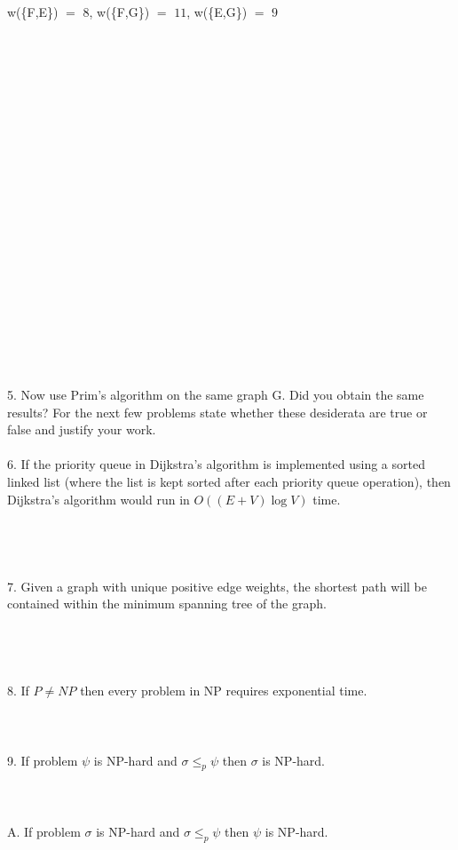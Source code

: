 \documentclass[12pt]{article}
\begin{document}
w(\{F,E\}) $=$ $8$, w(\{F,G\}) $=$ $11$, w(\{E,G\}) $=$ $9$
\\\\\\\\\\\\\\\\\\\\\\\\\\\\\\\\\\\\\\\\\\\\
5. Now use Prim's algorithm on the same graph G. Did you obtain the same results?
\newpage
\noindent For the next few problems state whether these desiderata are true or false and justify your work.\\\\
6. If the priority queue in Dijkstra’s algorithm is 
implemented using a sorted linked list
(where the list is kept sorted after 
each priority queue operation), then 
Dijkstra’s algorithm
would run in $O((E+V)\log{V} )$ time.\\\\\\\\\\
7. Given a graph with unique positive edge weights, the shortest path will be contained within the minimum 
spanning tree of the graph.\\\\\\\\\\
8. If $P \ne NP$ then every problem in NP requires exponential time.\\\\\\\\
9. If problem $\psi$ is NP-hard and $\sigma \le_p \psi$ then $\sigma$ is NP-hard.\\\\\\\\
A. If problem $\sigma$ is NP-hard and $\sigma \le_p \psi$ then $\psi$ is NP-hard.\\\\\\\\
\end{document}
